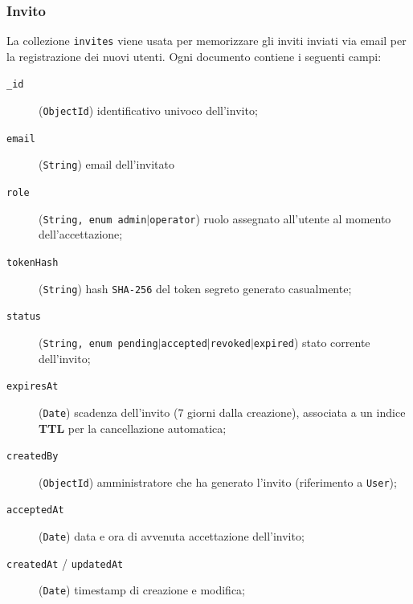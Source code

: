     \subsubsection{Invito}
        La collezione \texttt{invites} viene usata per memorizzare gli inviti
        inviati via email per la registrazione dei nuovi utenti. Ogni documento
        contiene i seguenti campi:
        \begin{description}
            \item[\texttt{\_id}] (\texttt{ObjectId}) identificativo univoco dell'invito;
            \item[\texttt{email}] (\texttt{String}) email dell'invitato
            \item[\texttt{role}] (\texttt{String, enum \texttt{admin}$|$\texttt{operator}}) ruolo assegnato all'utente al momento dell'accettazione;
            \item[\texttt{tokenHash}] (\texttt{String}) hash \texttt{SHA-256} del token segreto generato casualmente;
            \item[\texttt{status}] (\texttt{String, enum \texttt{pending}$|$\texttt{accepted}$|$\texttt{revoked}$|$\texttt{expired}}) stato corrente dell'invito;
            \item[\texttt{expiresAt}] (\texttt{Date}) scadenza dell'invito (7 giorni dalla creazione), associata a un indice \textbf{TTL} per la cancellazione automatica;
            \item[\texttt{createdBy}] (\texttt{ObjectId}) amministratore che ha generato l'invito (riferimento a \texttt{User});
            \item[\texttt{acceptedAt}] (\texttt{Date}) data e ora di avvenuta accettazione dell'invito;
            \item[\texttt{createdAt} / \texttt{updatedAt}] (\texttt{Date}) timestamp di creazione e modifica;
        \end{description}
